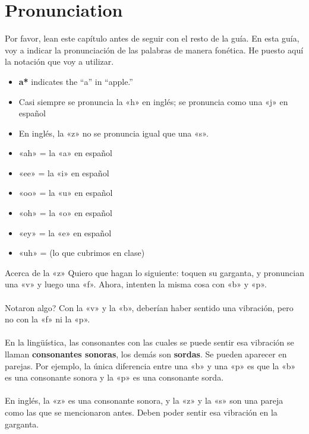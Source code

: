 \chapter{Pronunciation}

Por favor, lean este cap\'itulo antes de seguir con el resto de la gu\'ia.
En esta guía, voy a indicar la pronunciaci\'on de las palabras de manera fon\'etica.
He puesto aquí la notaci\'on que voy a utilizar.


\begin{itemize}
	\item \textbf{a*} indicates the ``a'' in ``apple.''
	\item Casi siempre se pronuncia la «h» en inglés;
			se pronuncia como una «j» en espa\~nol
	\item En inglés, la «z» no se pronuncia igual que una «s».
	\item «ah» = la «a» en espa\~nol
	\item «ee» = la «i» en espa\~nol
	\item «oo» = la «u» en espa\~nol
	\item «oh» = la «o» en espa\~nol
	\item «ey» = la «e» en espa\~nol
	\item «uh» =  (lo que cubrimos en clase)
\end{itemize}

\begin{conf}{Acerca de la «z»}
Quiero que hagan lo siguiente: toquen su garganta, y pronuncian una «v» y luego una «f».
	Ahora, intenten la misma cosa con «b» y «p».\\
\\
\textquestiondown Notaron algo? Con la «v» y la «b», deber\'ian haber
	sentido una vibraci\'on, pero no con la «f» ni la «p». \\
\\
En la ling\"u\'istica, las consonantes con las cuales se puede sentir esa vibraci\'on
	se llaman \textbf{consonantes sonoras}, los dem\'as son \textbf{sordas}. Se pueden
	aparecer en parejas. Por ejemplo, la \'unica diferencia entre una «b» y una «p» es
	que la «b» es una consonante sonora y la «p» es una consonante sorda.\\
\\
En ingl\'es, la «z» es una consonante sonora, y la «z» y la «s» son una pareja como las que se mencionaron antes. Deben poder sentir esa vibraci\'on en la garganta.
\end{conf}
